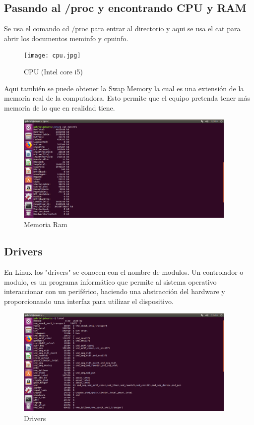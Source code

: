 \documentclass[
  letterpaper, 
  maincolor=black,
  sectioncolor=black!90,
  subsectioncolor=black!70,
  itemtextcolor=black!40,
]{fortysecondscv}
\begin{document}
    \subsection{Pasando al /proc y encontrando CPU y RAM}
        Se usa el comando cd /proc para entrar al directorio y aqui se usa el cat para abrir los documentos meminfo y cpuinfo.
        \begin{figure}[H]
            \centering
            \texttt{[image: cpu.jpg]}
            \caption{CPU (Intel core i5)}
            \label{fig:my_label}
        \end{figure}
        Aqui también se puede obtener la Swap Memory la cual es una extensión de la memoria real de la computadora. Esto permite que el equipo pretenda tener más memoria de lo que en realidad tiene.
        \begin{figure}[H]
            \centering
            \includegraphics[trim= 0 320 750 0,clip,width=0.95\textwidth]{img/ram.jpg}
            \caption{Memoria Ram}
            \label{fig:my_label}
        \end{figure}
    \newpage
    \subsection{Drivers}
        En Linux los "drivers" se conocen con el nombre de modulos. Un controlador o modulo, es un programa informático que permite al sistema operativo interaccionar con un periférico, haciendo una abstracción del hardware y proporcionando una interfaz para utilizar el dispositivo.
        \begin{figure}[H]
            \centering
            \includegraphics[trim= 0 320 750 0,clip,width=0.95\textwidth]{img/drivers.jpg}
            \caption{Drivers}
            \label{fig:my_label}
        \end{figure}
\end{document}
